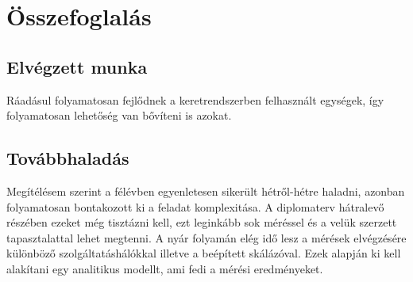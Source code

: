 \chapter{Összefoglalás}
\label{sec:summary}


\section{Elvégzett munka}




Ráadásul folyamatosan fejlődnek a keretrendszerben felhasznált egységek, így folyamatosan lehetőség van bővíteni is azokat.

\section{Továbbhaladás}
Megítélésem szerint a félévben egyenletesen sikerült hétről-hétre haladni, azonban folyamatosan bontakozott ki a feladat komplexitása.
A diplomaterv hátralevő részében ezeket még tisztázni kell, ezt leginkább sok méréssel és a velük szerzett tapasztalattal lehet megtenni. 
A nyár folyamán elég idő lesz a mérések elvégzésére különböző szolgáltatáshálókkal illetve a beépített skálázóval. 
Ezek alapján ki kell alakítani egy analitikus modellt, ami fedi a mérési eredményeket. 

